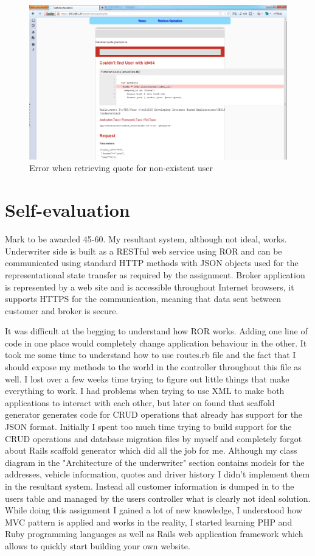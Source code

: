 \documentclass[10pt,a4paper,headinclude=true,twoside]{report}
\begin{document}
\begin{figure}[H]
\centering
\centerline{\includegraphics[scale=0.45]{./retriveQuoteError}}
\caption{Error when retrieving quote for non-existent user}
\label{fig:retriveQuoteError}
\end{figure} 
\newpage
\section{Self-evaluation}
Mark to be awarded 45-60. My resultant system, although not ideal, works. Underwriter side is built as a RESTful web service using ROR and can be communicated using standard HTTP methods with JSON objects used for the representational state transfer as required by the assignment. Broker application is represented by a web site and is accessible throughout Internet browsers, it supports HTTPS for the communication, meaning that data sent between customer and broker is secure.

It was difficult at the begging to understand how ROR works. Adding one line of code in one place would completely change application behaviour in the other. It took me some time to understand how to use routes.rb file and the fact that I should expose my methods to the world in the controller throughout this file as well. I lost over a few weeks time trying to figure out little things that make everything to work. I had problems when trying to use XML to make both applications to interact with each other, but later on found that scaffold generator generates code for CRUD operations that already has support for the JSON format. Initially I spent too much time trying to build support for the CRUD operations and database migration files by myself and completely forgot about Rails scaffold generator which did all the job for me. Although my class diagram in the "Architecture of the underwriter" section contains models for the addresses, vehicle information, quotes and driver history I didn't implement them in the resultant system. Instead all customer information is dumped in to the users table and managed by the users controller what is clearly not ideal solution. While doing this assignment I gained a lot of new knowledge, I understood how MVC pattern is applied and works in the reality, I started learning PHP and Ruby programming languages as well as Rails web application framework which allows to quickly start building your own website.
\end{document}
